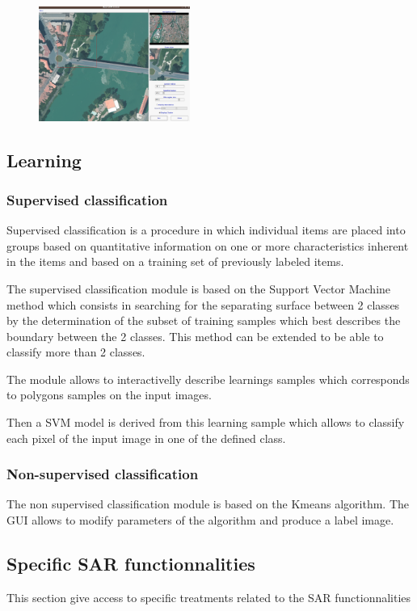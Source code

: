 \begin{figure}
  \center
  \includegraphics[width=0.44\textwidth]{../Art/MonteverdiImages/monteverdi_mean_shift.png}
  \label{fig:meanshift}
\end{figure}

\subsection{Learning}
\subsubsection{Supervised classification}
Supervised classification is a procedure in which individual items are
placed into groups based on quantitative information on one or more
characteristics inherent in the items and based on a training set of
previously labeled items.

The supervised classification module is based on the Support Vector
Machine method which consists in searching for the separating surface
between 2 classes by the determination of the subset of training
samples which best describes the boundary between the 2 classes. This
method can be extended to be able to classify more than 2 classes.

The module allows to interactivelly describe learnings samples which
corresponds to polygons samples on the input images.

Then a SVM model is derived from this learning sample which allows to
classify each pixel of the input image in one of the defined class.


\subsubsection{Non-supervised classification}
The non supervised classification module is based on the Kmeans
algorithm.  The GUI allows to modify parameters of the algorithm and
produce a label image.
\subsection{Specific SAR functionnalities}
This section give access to specific treatments related to the SAR
functionnalities

